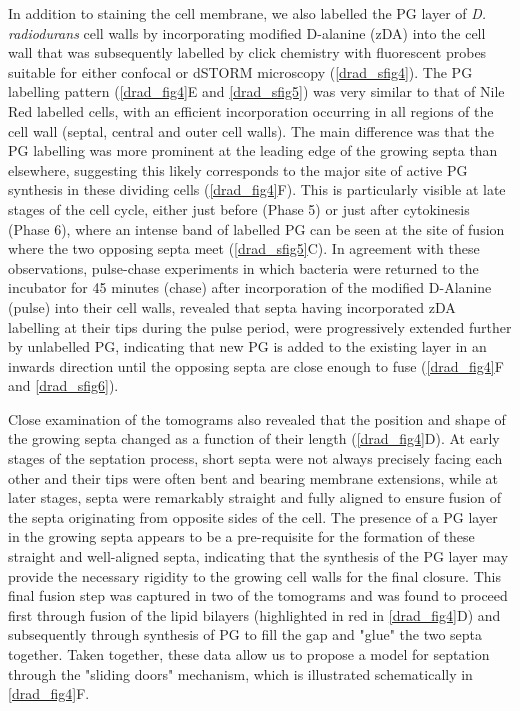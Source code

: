 In addition to staining the cell membrane, we also labelled the PG layer of \textit{D. radiodurans} cell walls by incorporating modified D-alanine (zDA) into the cell wall that was subsequently labelled by click chemistry with fluorescent probes suitable for either confocal or dSTORM microscopy (\autoref{drad_sfig4}).
The PG labelling pattern (\autoref{drad_fig4}E and \autoref{drad_sfig5}) was very similar to that of Nile Red labelled cells, with an efficient incorporation occurring in all regions of the cell wall (septal, central and outer cell walls).
The main difference was that the PG labelling was more prominent at the leading edge of the growing septa than elsewhere, suggesting this likely corresponds to the major site of active PG synthesis in these dividing cells (\autoref{drad_fig4}F).
This is particularly visible at late stages of the cell cycle, either just before (Phase 5) or just after cytokinesis (Phase 6), where an intense band of labelled PG can be seen at the site of fusion where the two opposing septa meet (\autoref{drad_sfig5}C).
In agreement with these observations, pulse-chase experiments in which bacteria were returned to the incubator for 45 minutes (chase) after incorporation of the modified D-Alanine (pulse) into their cell walls, revealed that septa having incorporated zDA labelling at their tips during the pulse period, were progressively extended further by unlabelled PG, indicating that new PG is added to the existing layer in an inwards direction until the opposing septa are close enough to fuse (\autoref{drad_fig4}F and \autoref{drad_sfig6}).

Close examination of the tomograms also revealed that the position and shape of the growing septa changed as a function of their length (\autoref{drad_fig4}D).
At early stages of the septation process, short septa were not always precisely facing each other and their tips were often bent and bearing membrane extensions, while at later stages, septa were remarkably straight and fully aligned to ensure fusion of the septa originating from opposite sides of the cell.
The presence of a PG layer in the growing septa appears to be a pre-requisite for the formation of these straight and well-aligned septa, indicating that the synthesis of the PG layer may provide the necessary rigidity to the growing cell walls for the final closure.
This final fusion step was captured in two of the tomograms and was found to proceed first through fusion of the lipid bilayers (highlighted in red in \autoref{drad_fig4}D) and subsequently through synthesis of PG to fill the gap and "glue" the two septa together.
Taken together, these data allow us to propose a model for septation through the "sliding doors" mechanism, which is illustrated schematically in \autoref{drad_fig4}F.

